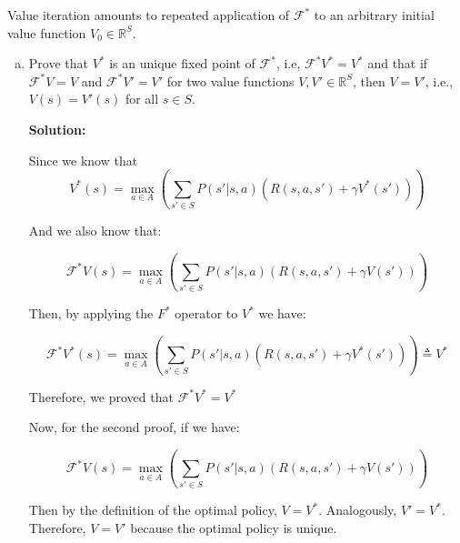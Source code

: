 \documentclass[12pt]{article}
\begin{document}
Value iteration amounts to repeated application of $\mathcal F ^*$ to an 
arbitrary initial value function $V _0 \in \mathbb R ^ { S }$. 
\begin{enumerate}[a)]
  \item Prove that $V ^*$ is an unique fixed point of $\mathcal F ^*$, i.e, 
    $\mathcal F ^* V ^* = V ^*$ and that if 
    $\mathcal F ^* V = V$ and $\mathcal F ^* V ' = V '$ 
    for two value functions $V, V' \in \mathbb R ^S$, 
    then $V = V'$, i.e., $V(s) = V'(s)$ for all $s \in S$.

    \textbf{Solution:}

    Since we know that 
    \begin{equation}
       V ^*(s) = \max _{a \in A} 
    \left(
      \sum _{s' \in S} 
        P(s' | s, a) \left(
          R (s, a, s') + \gamma V ^*( s' )
        \right)
    \right) 
    \end{equation}

    And we also know that:

    \begin{equation}
  \mathcal F ^* V (s) 
    = \max _{a \in A} 
      \left(
        \sum _{s' \in S} 
          P(s' | s, a) \left(
            R (s, a, s') + \gamma V ( s' )
          \right)
      \right)
    \end{equation}

    Then, by applying the $F ^*$ operator to $V^*$ we have:

    \begin{equation}
       \mathcal F ^* V^* (s) 
    = \max _{a \in A} 
      \left(
        \sum _{s' \in S} 
          P(s' | s, a) \left(
            R (s, a, s') + \gamma V^* ( s' )
          \right)
      \right) \triangleq V^*
    \end{equation}

    Therefore, we proved that $\mathcal F ^* V ^* = V ^*$

    Now, for the second proof, if we have:

\begin{equation}
       \mathcal F ^* V (s) 
    = \max _{a \in A} 
      \left(
        \sum _{s' \in S} 
          P(s' | s, a) \left(
            R (s, a, s') + \gamma V ( s' )
          \right)
      \right)
    \end{equation}

    Then by the definition of the optimal policy, $V=V^*$. Analogously, $V'=V^*$. Therefore, $V=V'$ because the optimal policy is unique.



\end{enumerate}
\end{document}
